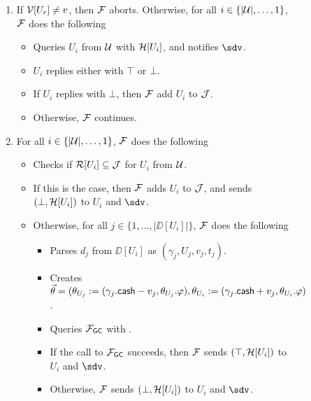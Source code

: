 \begin{figure*}[!t]
{{\begin{enumerate}
	\item If $\mathcal{V}[U_r] \neq v$, then $\mathcal{F}$ aborts. Otherwise, for all $i \in \{|\mathcal{U}|,\ldots,1\}$, 
	$\mathcal{F}$ does the following
	\begin{itemize}[label=-]
		\item Queries $U_i$ from $\mathcal{U}$ with $\mathcal{H}[U_i]$, and notifies $\sdv$.
		\item $U_i$ replies either with $\top$ or $\bot$.
		\item If $U_i$ replies with $\bot$, then $\mathcal{F}$ add $U_i$ to $\mathcal{J}$. 
		\item Otherwise, $\mathcal{F}$ continues.
	\end{itemize}
	
	
	\item For all $i \in \{|\mathcal{U}|,\ldots,1\}$, $\mathcal{F}$ does the following 
	\begin{itemize}[label=-]
		\item Checks if $\mathcal{R}[U_i] \subseteq \mathcal{J}$ for $U_i$ from $\mathcal{U}$.
		\item If this is the case, then $\mathcal{F}$ adds $U_i$ to $\mathcal{J}$, and sends $(\bot, \mathcal{H}[U_i])$ 
		to $U_i$ and $\sdv$.
		\item Otherwise, for all $j \in \{1,\ldots,|\DD[U_i]|\}$, $\mathcal{F}$ does the following
		\begin{itemize}[label=$\circ$]
			\item Parses $d_j$ from $\DD[U_i]$ as $(\gamma_j,U_j,v_j,t_j)$.
			\item Creates $\vec{\theta} = (\theta_{U_j} := (\gamma_j.\mathsf{cash} - v_j, \theta_{U_j}.
			\varphi), \theta_{U_i} := (\gamma_j.\mathsf{cash} + v_j, \theta_{U_i}.\varphi)$. 
			\item Queries $\mathcal{F}_{\mathsf{GC}}$ with . 
			\item If the call to $\mathcal{F}_{\mathsf{GC}}$ succeeds, then $\mathcal{F}$ sends $(\top, \mathcal{H}[U_i])$ to 
			$U_i$ and $\sdv$.
			\item Otherwise, $\mathcal{F}$ sends $(\bot, \mathcal{H}[U_i])$ to $U_i$ and $\sdv$.
		\end{itemize}
	\end{itemize}
\end{enumerate}
}}


\end{figure*}
